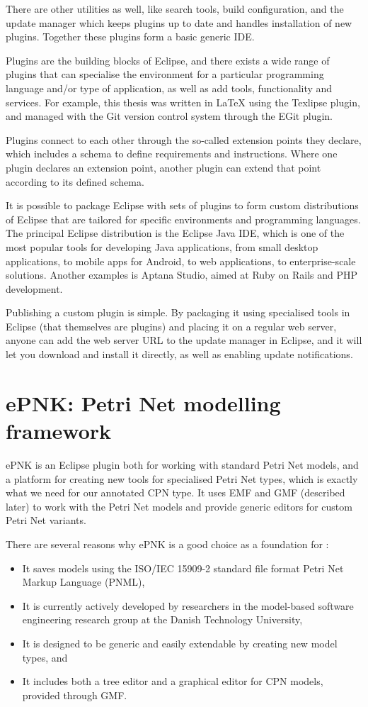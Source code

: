 There are other utilities as well, like search tools, build configuration, and
the update manager which keeps plugins up to date and handles installation of
new plugins. Together these plugins form a basic generic IDE.

Plugins are the building blocks
of Eclipse, and there exists a wide range of plugins that can specialise the
environment for a particular programming language and/or type of application,
as well as add tools, functionality and services. For example, this thesis was
written in \LaTeX{} using the Texlipse plugin, and managed with the Git version
control system through the EGit plugin.

Plugins connect to each other through the so-called extension points they
declare, which includes a schema to define requirements and instructions.
Where one plugin declares an extension point, another plugin can extend that
point according to its defined schema.

It is possible to package Eclipse with sets of plugins to form custom
distributions of Eclipse that are tailored for specific environments and
programming languages. The principal Eclipse distribution is the Eclipse Java
IDE, which is one of the most popular tools for developing Java applications,
from small desktop applications, to mobile apps for Android, to web
applications, to enterprise-scale solutions. Another examples is Aptana Studio,
aimed at Ruby on Rails and PHP development. 

Publishing a custom plugin is simple. By packaging it using specialised tools
in Eclipse (that themselves are plugins) and placing it on a regular web
server, anyone can add the web server URL to the update manager in Eclipse, and
it will let you download and install it directly, as well as enabling update
notifications.


\section{ePNK: Petri Net modelling framework}
\label{sec:epnk}
ePNK is an Eclipse plugin both for working with standard Petri Net models, and a
platform for creating new tools for specialised Petri Net types, which is
exactly what we need for our annotated CPN type. It uses EMF and GMF
(described later) to work with the Petri Net models and provide generic
editors for custom Petri Net variants.

There are several reasons why ePNK is a good choice as a foundation for \thename{}:
\begin{itemize}
	\item It saves models using the ISO/IEC 15909-2 \cite{ISO-15909-2} standard
	file format Petri Net Markup Language (PNML),
	\item It is currently actively developed by researchers in the model-based
	software engineering research group at the Danish Technology University,
	\item It is designed to be generic and easily extendable by creating new model
	types, and
	\item It includes both a tree editor and a graphical editor for CPN models,
	provided through GMF.
\end{itemize}

